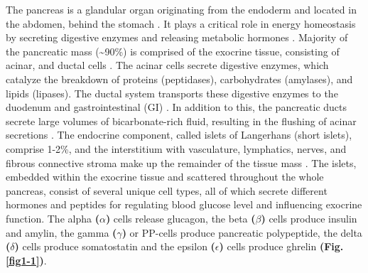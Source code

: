 The pancreas is a glandular organ originating from the endoderm and located in the abdomen, behind the stomach \textbf{\cite{shih_pancreas_2013}}. It plays a %
critical role 
in energy homeostasis
by secreting digestive enzymes and releasing metabolic hormones \textbf{\cite{kimmel_molecular_2010, baron_single-cell_2016}}. %
Majority of the pancreatic mass (\textasciitilde 90\%) is comprised of the exocrine tissue, consisting of acinar, 
and ductal cells \textbf{\cite{pandiri_overview_2014}}. The acinar cells secrete digestive enzymes, which catalyze the breakdown of proteins (peptidases), carbohydrates (amylases), and lipids (lipases). The ductal system transports these digestive enzymes to the duodenum and gastrointestinal (GI) \textbf{\cite{shih_pancreas_2013, baron_single-cell_2016}}.  In addition to this, the 
pancreatic ducts %
secrete large volumes of bicarbonate-rich fluid, resulting in the flushing of acinar secretions \textbf{\cite{pandiri_overview_2014, low_pancreatic_2010}}. The endocrine component, called islets of Langerhans (short islets), comprise 1-2\%, and the interstitium with vasculature, lymphatics, nerves, and fibrous connective stroma make up the remainder of the tissue mass \textbf{\cite{pandiri_overview_2014}}. %
The islets, embedded within the exocrine tissue and scattered throughout the whole pancreas, consist of several unique cell types, all of which secrete different hormones and peptides for regulating %
blood glucose level \textbf{\cite{shih_pancreas_2013, baron_single-cell_2016}} and influencing exocrine function. The alpha \textbf{($\alpha$)} cells release glucagon, the beta \textbf{($\beta$)} cells produce insulin and amylin, the gamma \textbf{($\gamma$)} or PP-cells produce pancreatic polypeptide, the delta \textbf{($\delta$)} cells produce somatostatin and the epsilon \textbf{($\epsilon$)} cells produce ghrelin \textbf{\cite{mastracci_endocrine_2012} (Fig.\ref{fig1-1})}.\\

